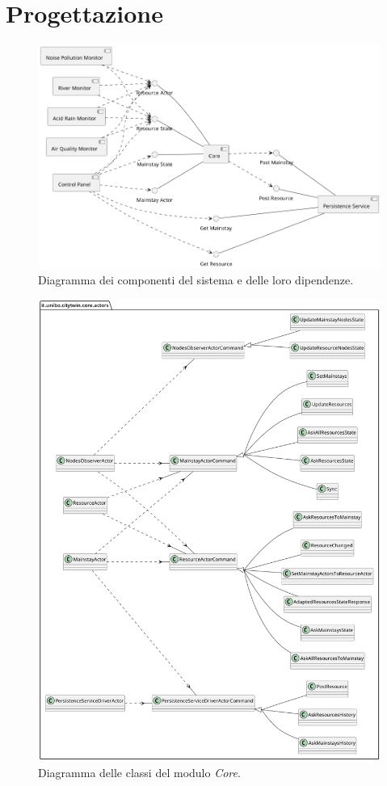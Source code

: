 \documentclass[12pt]{article}
\begin{document}
\section{Progettazione}

\begin{figure}[h]
\caption{Diagramma dei componenti del sistema e delle loro dipendenze.}
    \includegraphics[width=\textwidth]{../assets/images/core-component-diagram.png}
\end{figure}

\begin{figure}[h]
    \caption{Diagramma delle classi del modulo \textit{Core}.}
    \includegraphics[width=\textwidth]{../assets/images/core-class-diagram.png}
\end{figure}
\end{document}
